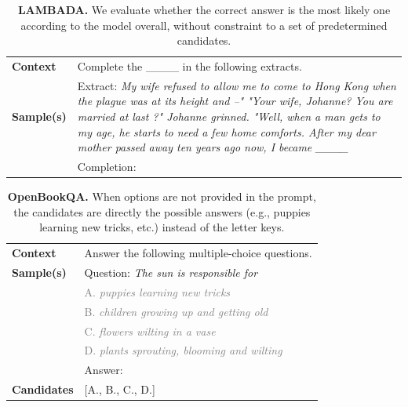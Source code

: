 \documentclass{article}
\begin{document}
\begin{table}[h]
\caption{\textbf{LAMBADA.} We evaluate whether the correct answer is the most likely one according to the model overall, without constraint to a set of predetermined candidates.}
\begin{tabular}{lp{11.5cm}}
\toprule
\textbf{Context}   & Complete the \_\_\_\_ in the following extracts.\\
\textbf{Sample(s)} & Extract: \emph{My wife refused to allow me to come to Hong Kong when the plague was at its height and –" "Your wife, Johanne? You are married at last ?" Johanne grinned. "Well, when a man gets to my age, he starts to need a few home comforts. After my dear mother passed away ten years ago now, I became \_\_\_\_} \\
& Completion:\\         \bottomrule                                                                        
\end{tabular}
\end{table}


\begin{table}[h]
\caption{\textbf{OpenBookQA.} When options are not provided in the prompt, the candidates are directly the possible answers (e.g., puppies learning new tricks, etc.) instead of the letter keys.}
\begin{tabular}{lp{11.5cm}}
\toprule
\textbf{Context}   & Answer the following multiple-choice questions.\\
\textbf{Sample(s)} & Question: \emph{The sun is responsible for} \\
& \textcolor{gray}{A. \emph{puppies learning new tricks}} \\
& \textcolor{gray}{B. \emph{children growing up and getting old}} \\
& \textcolor{gray}{C. \emph{flowers wilting in a vase}} \\
& \textcolor{gray}{D. \emph{plants sprouting, blooming and wilting}} \\
& Answer:\\
\textbf{Candidates}   & {[}A., B., C., D.{]}         \\                                                 \bottomrule                                                                                                         
\end{tabular}
\end{table}
\end{document}
